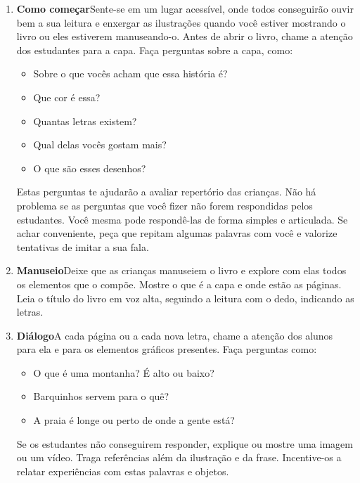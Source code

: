 \documentclass[11pt]{extarticle}
\begin{document}
\begin{enumerate}
\item \textbf{Como começar}\quad Sente-se em um lugar acessível, 
onde todos conseguirão ouvir bem a sua leitura e enxergar as ilustrações 
quando você estiver mostrando o livro ou eles estiverem manuseando-o. 
Antes de abrir o livro, chame a atenção dos estudantes para a capa. 
Faça perguntas sobre a capa, como: 

\begin{itemize}
\item Sobre o que vocês acham que essa história é?
\item Que cor é essa?
\item Quantas letras existem? 
\item Qual delas vocês gostam mais?
\item O que são esses desenhos?
\end{itemize}

Estas perguntas te ajudarão a avaliar repertório das crianças. 
Não há problema se as perguntas que você fizer não forem respondidas pelos 
estudantes. Você mesma pode respondê-las de forma simples e articulada. Se achar 
conveniente, peça que repitam algumas palavras com você e valorize tentativas 
de imitar a sua fala. 
 
\item \textbf{Manuseio}\quad Deixe que as crianças manuseiem o livro 
e explore com elas todos os elementos que o compõe. Mostre o que é a 
capa e onde estão as páginas. Leia o título do livro em voz alta, seguindo 
a leitura com o dedo, indicando as letras. 

\item \textbf{Diálogo}\quad A cada página ou a cada nova letra,
chame a atenção dos alunos para ela e para os elementos gráficos
presentes. Faça perguntas como:

\begin{itemize}
\item O que é uma montanha? É alto ou baixo?
\item Barquinhos servem para o quê?
\item A praia é longe ou perto de onde a gente está?
\end{itemize}

Se os estudantes não conseguirem responder, explique ou mostre uma 
imagem ou um vídeo. Traga referências além da ilustração e da frase. 
Incentive-os a relatar experiências com estas palavras e objetos.


\end{enumerate}
\end{document}

